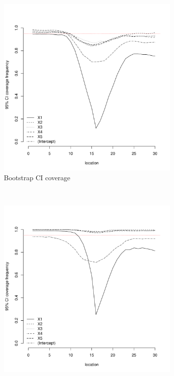 \documentclass[authoryear, review, 11pt]{elsarticle}
\begin{document}
\begin{figure}
	\vspace{-30mm}
	\centering
	\begin{subfigure}[b]{0.45\textwidth}
	\centering
		\includegraphics[width=\textwidth]{../../figures/simulation/15.13.profile_bootstrap_coverage.pdf}
		\caption{Bootstrap CI coverage}
	\end{subfigure}%
	~ %
	\begin{subfigure}[b]{0.45\textwidth}
	\centering
		\includegraphics[width=\textwidth]{../../figures/simulation/15.13.profile_se_coverage.pdf}

\end{subfigure}
\end{figure}
\end{document}
